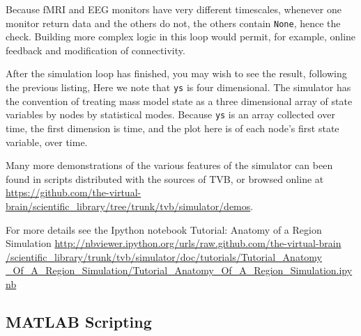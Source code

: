 \noindent Because fMRI and EEG monitors have very different
timescales, whenever one monitor return data and the others do
not, the others contain \texttt{None}, hence the check. Building
more complex logic in this loop would permit, for example, online
feedback and modification of connectivity. 

After the simulation loop has finished, you may wish to see the
result, following the previous listing, 
\noindent Here we note that \texttt{ys} is four dimensional. The 
simulator has the convention of treating  mass model state as a
three dimensional array of state variables by nodes by statistical
modes. Because \texttt{ys} is an array collected over time, the first
dimension is time, and the plot here is of each node's first state
variable, over time.

Many more demonstrations of the various features of the simulator
can been found in scripts distributed with the sources of TVB, or 
browsed online at \url{https://github.com/the-virtual-brain/scientific_library/tree/trunk/tvb/simulator/demos}.

For more details see the Ipython notebook Tutorial: Anatomy of a Region Simulation 
\url{http://nbviewer.ipython.org/urls/raw.github.com/the-virtual-brain
/scientific_library/trunk/tvb/simulator/doc/tutorials/Tutorial_Anatomy
_Of_A_Region_Simulation/Tutorial_Anatomy_Of_A_Region_Simulation.ipynb}

\subsection{MATLAB Scripting}


